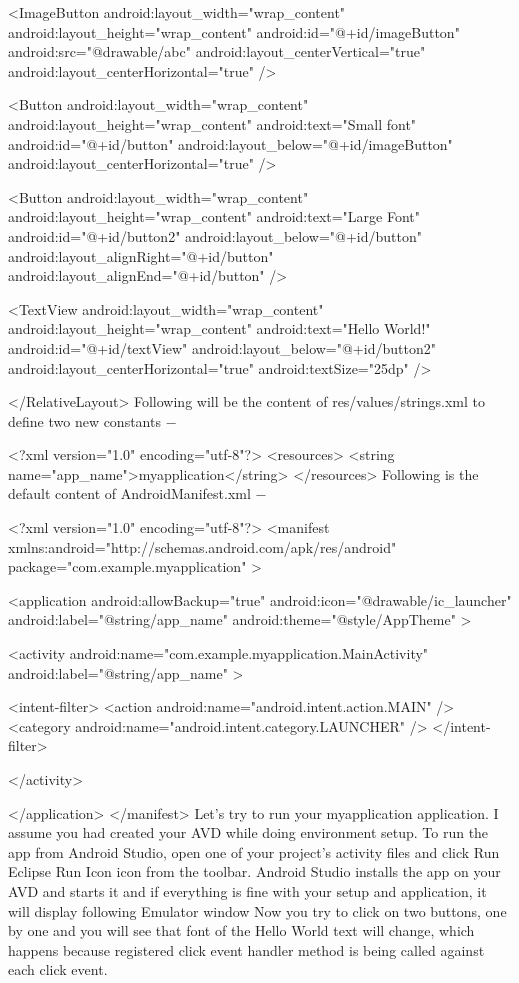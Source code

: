 \documentclass{fisatproject}
\begin{document}
   <ImageButton
      android:layout_width="wrap_content"
      android:layout_height="wrap_content"
      android:id="@+id/imageButton"
      android:src="@drawable/abc"
      android:layout_centerVertical="true"
      android:layout_centerHorizontal="true" />
      
   <Button
      android:layout_width="wrap_content"
      android:layout_height="wrap_content"
      android:text="Small font"
      android:id="@+id/button"
      android:layout_below="@+id/imageButton"
      android:layout_centerHorizontal="true" />
      
   <Button
      android:layout_width="wrap_content"
      android:layout_height="wrap_content"
      android:text="Large Font"
      android:id="@+id/button2"
      android:layout_below="@+id/button"
      android:layout_alignRight="@+id/button"
      android:layout_alignEnd="@+id/button" />
      
   <TextView
      android:layout_width="wrap_content"
      android:layout_height="wrap_content"
      android:text="Hello World!"
      android:id="@+id/textView"
      android:layout_below="@+id/button2"
      android:layout_centerHorizontal="true"
      android:textSize="25dp" />
      
</RelativeLayout>
Following will be the content of res/values/strings.xml to define two new constants −

<?xml version="1.0" encoding="utf-8"?>
<resources>
   <string name="app_name">myapplication</string>
</resources>
Following is the default content of AndroidManifest.xml −

<?xml version="1.0" encoding="utf-8"?>
<manifest xmlns:android="http://schemas.android.com/apk/res/android"
   package="com.example.myapplication" >
      
   <application
      android:allowBackup="true"
      android:icon="@drawable/ic_launcher"
      android:label="@string/app_name"
      android:theme="@style/AppTheme" >
      
      <activity
         android:name="com.example.myapplication.MainActivity"
         android:label="@string/app_name" >
      
         <intent-filter>
            <action android:name="android.intent.action.MAIN" />
            <category android:name="android.intent.category.LAUNCHER" />
         </intent-filter>
      
      </activity>
      
   </application>
</manifest>
Let's try to run your myapplication application. I assume you had created your AVD while doing environment setup. To run the app from Android Studio, open one of your project's activity files and click Run Eclipse Run Icon icon from the toolbar. Android Studio installs the app on your AVD and starts it and if everything is fine with your setup and application, it will display following Emulator window 
Now you try to click on two buttons, one by one and you will see that font of the Hello World text will change, which happens because registered click event handler method is being called against each click event.
\end{document}
